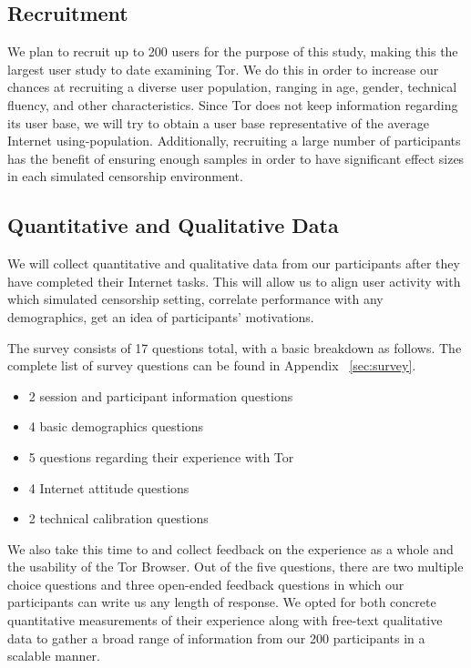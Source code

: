 \documentclass[letterpaper,twocolumn,11pt]{article}
\begin{document}
\subsection{Recruitment}  
\indent \indent We plan to recruit up to 200 users for the purpose of this study, making this the largest user 
study to date examining Tor. We do this in order to increase our chances at recruiting a diverse
user population, ranging in age, gender, technical fluency, and other characteristics. Since Tor 
does not keep information regarding its user base, we will try to obtain a user base representative of
the average Internet using-population. Additionally, recruiting a large number of participants has the 
benefit of ensuring enough samples in order to have significant effect sizes in 
each simulated censorship environment. 

\subsection{Quantitative and Qualitative Data}   
\indent \indent We will collect quantitative and qualitative data from our participants after they have completed 
their Internet tasks. This will allow us to align user activity with which simulated censorship setting, 
correlate performance with any demographics, get an idea of participants' motivations. 

The survey consists of 17 questions total, with a basic breakdown as follows. 
The complete list of survey questions can be found in Appendix ~\ref{sec:survey}.

\begin{itemize} \itemsep1pt \parskip0pt 
\item 2 session and participant information questions
\item 4 basic demographics questions
\item 5 questions regarding their experience with Tor
\item 4 Internet attitude questions
\item 2 technical calibration questions
\end{itemize}

We also take this time to and collect feedback on the experience as a whole and the usability of 
the Tor Browser. Out of the five questions, there are two multiple choice questions and three 
open-ended feedback questions in which our participants can write us any length of response. 
We opted for both concrete quantitative measurements of their experience along with free-text
qualitative data to gather a broad range of information from our 200 participants in a scalable manner. 
\end{document}
